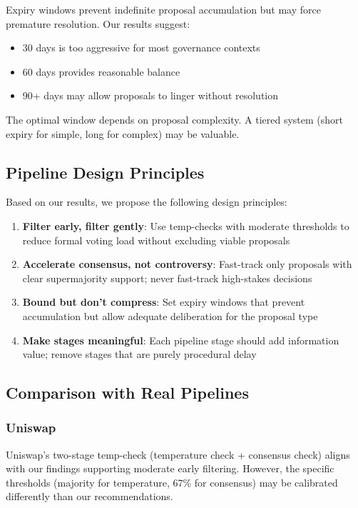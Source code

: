 Expiry windows prevent indefinite proposal accumulation but may force premature resolution. Our results suggest:
\begin{itemize}
    \item 30 days is too aggressive for most governance contexts
    \item 60 days provides reasonable balance
    \item 90+ days may allow proposals to linger without resolution
\end{itemize}

The optimal window depends on proposal complexity. A tiered system (short expiry for simple, long for complex) may be valuable.

\subsection{Pipeline Design Principles}

Based on our results, we propose the following design principles:

\begin{enumerate}
    \item \textbf{Filter early, filter gently}: Use temp-checks with moderate thresholds to reduce formal voting load without excluding viable proposals

    \item \textbf{Accelerate consensus, not controversy}: Fast-track only proposals with clear supermajority support; never fast-track high-stakes decisions

    \item \textbf{Bound but don't compress}: Set expiry windows that prevent accumulation but allow adequate deliberation for the proposal type

    \item \textbf{Make stages meaningful}: Each pipeline stage should add information value; remove stages that are purely procedural delay
\end{enumerate}

\subsection{Comparison with Real Pipelines}

\subsubsection{Uniswap}

Uniswap's two-stage temp-check (temperature check + consensus check) aligns with our findings supporting moderate early filtering. However, the specific thresholds (majority for temperature, 67\% for consensus) may be calibrated differently than our recommendations.


